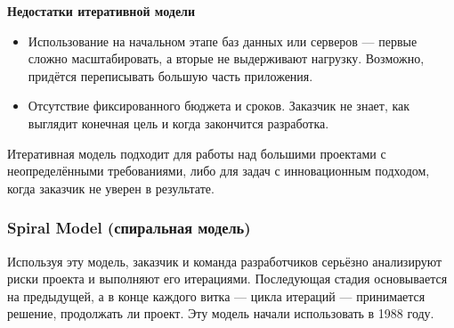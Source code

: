 \documentclass[a4paper]{article}
\begin{document}
\noindent\textbf{Недостатки итеративной модели}
\begin{itemize}
  \item Использование на начальном этапе баз данных или серверов — первые сложно масштабировать, а вторые не выдерживают нагрузку. Возможно, придётся переписывать большую часть приложения.
  \item Отсутствие фиксированного бюджета и сроков. Заказчик не знает, как выглядит конечная цель и когда закончится разработка.
\end{itemize}

Итеративная модель подходит для работы над большими проектами с неопределёнными требованиями, либо для задач с инновационным подходом, когда заказчик не уверен в результате.

\subsubsection{Spiral Model (спиральная модель)}

Используя эту модель, заказчик и команда разработчиков серьёзно анализируют риски проекта и выполняют его итерациями. Последующая стадия основывается на предыдущей, а в конце каждого витка — цикла итераций — принимается решение, продолжать ли проект. Эту модель начали использовать в 1988 году.

\begin{figure}[h]
\end{figure}
\end{document}
